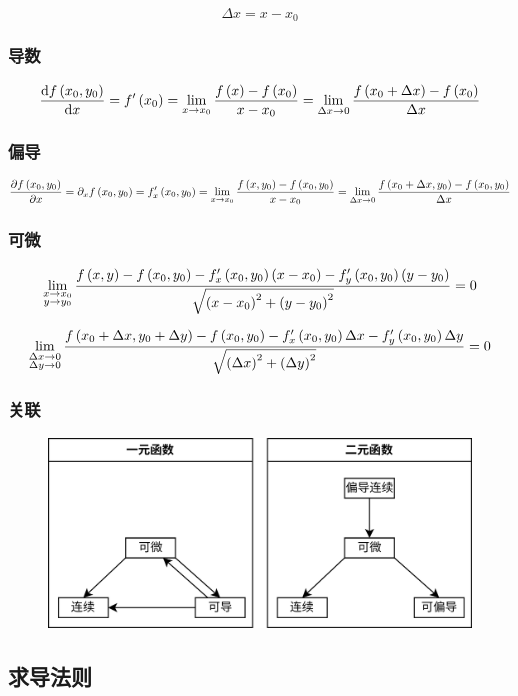 \documentclass{article}
\begin{document}
\[\Delta x=x-x_0\]

\subsubsection{导数}

\[\frac{\mathrm d f\left(x_0,y_0\right)}{\mathrm d x}=f^\prime\left(x_0\right)=\lim_{x\to x_0}\frac{f\left(x\right)-f\left(x_0\right)}{x-x_0}=\lim_{\Delta x\to0}\frac{f\left(x_0+\Delta x\right)-f\left(x_0\right)}{\Delta x}\]

\subsubsection{偏导}

\[\frac{\partial f\left(x_0,y_0\right)}{\partial x}=\partial_x f\left(x_0,y_0\right)=f_x^\prime\left(x_0,y_0\right)=
    \lim_{x\to x_0}\frac{f\left(x,y_0\right)-f\left(x_0,y_0\right)}{x-x_0}=
    \lim_{\Delta x\to0}\frac{f\left(x_0+\Delta x,y_0\right)-f\left(x_0,y_0\right)}{\Delta x}\]

\subsubsection{可微}

\[\lim_{\substack{x\to x_0 \\ y\to y_0}}\frac{f\left(x,y\right)-f\left(x_0,y_0\right)-f_x^\prime\left(x_0,y_0\right)\left(x-x_0\right)-f_y^\prime\left(x_0,y_0\right)\left(y-y_0\right)}{\sqrt{\left(x-x_0\right)^2+\left(y-y_0\right)^2}}=0\]

\[\lim_{\substack{\Delta x\to0 \\ \Delta y\to0}}\frac{f\left(x_0+\Delta x,y_0+\Delta y\right)-f\left(x_0,y_0\right)-f_x^\prime\left(x_0,y_0\right)\Delta x-f_y^\prime\left(x_0,y_0\right)\Delta y}{\sqrt{\left(\Delta x\right)^2+\left(\Delta y\right)^2}}=0\]

\subsubsection{关联}

\begin{figure}[H]
    \centering
    \includegraphics[width=0.6\linewidth]{RelationshipsOfDifferentiation.png}
\end{figure}

\subsection{求导法则}
\end{document}
